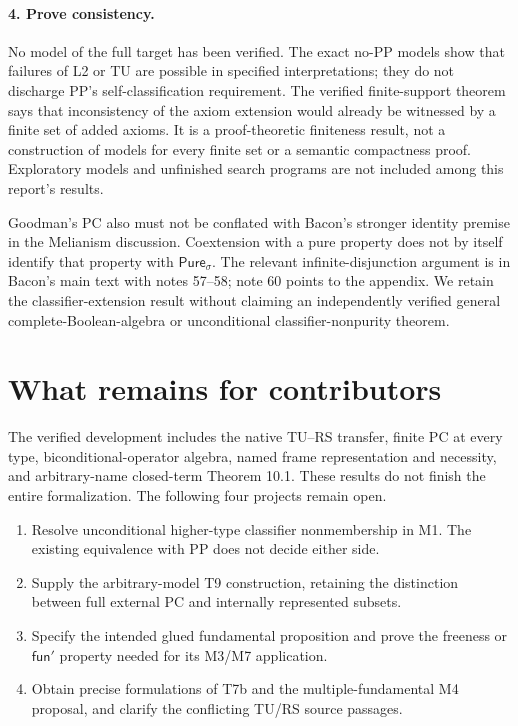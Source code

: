 \documentclass[12pt,leqno]{article}
\newcommand{\Pure}{\mathsf{Pure}}
\newcommand{\funp}{\mathsf{fun}'}
\begin{document}
\paragraph{4. Prove consistency.}
No model of the full target has been verified. The exact no-PP models
show that failures of L2 or TU are possible in specified interpretations;
they do not discharge PP's self-classification requirement. The verified
finite-support theorem says that inconsistency of the axiom extension
would already be witnessed by a finite set of added axioms. It is a
proof-theoretic finiteness result, not a construction of models for every
finite set or a semantic compactness proof. Exploratory models and
unfinished search programs are not included among this report's results.

Goodman's PC also must not be conflated with Bacon's stronger identity
premise in the Melianism discussion. Coextension with a pure property
does not by itself identify that property with $\Pure_\sigma$.
The relevant infinite-disjunction argument is in Bacon's main text
with notes 57--58; note 60 points to the appendix. We retain the
classifier-extension result without claiming an independently verified
general complete-Boolean-algebra or unconditional classifier-nonpurity
theorem.

\section{What remains for contributors}

The verified development includes the native TU--RS transfer, finite PC at
every type, biconditional-operator algebra, named frame representation and
necessity, and arbitrary-name closed-term Theorem 10.1. These results do not
finish the entire formalization. The following four projects remain open.

\begin{enumerate}
\item Resolve unconditional higher-type classifier nonmembership in M1.
The existing equivalence with PP does not decide either side.
\item Supply the arbitrary-model T9 construction, retaining the distinction
between full external PC and internally represented subsets.
\item Specify the intended glued fundamental proposition and prove the
freeness or $\funp$ property needed for its M3/M7 application.
\item Obtain precise formulations of T7b and the multiple-fundamental M4
proposal, and clarify the conflicting TU/RS source passages.
\end{enumerate}
\end{document}
